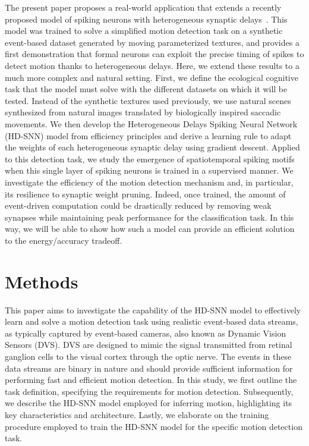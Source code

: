 \documentclass[default]{sn-jnl}%
\theoremstyle{thmstyleone}%
\theoremstyle{thmstyletwo}%
\theoremstyle{thmstylethree}%
\begin{document}
The present paper proposes a real-world application that extends a recently proposed model of spiking neurons with heterogeneous synaptic delays~\cite{grimaldi_learning_2022}. This model was trained to solve a simplified motion detection task on a synthetic event-based dataset generated by moving parameterized textures, and provides a first demonstration that formal neurons can exploit the precise timing of spikes to detect motion thanks to heterogeneous delays. Here, we extend these results to a much more complex and natural setting. First, we define the ecological cognitive task that the model must solve with the different datasets on which it will be tested. Instead of the synthetic textures used previously, we use natural scenes synthesized from natural images translated by biologically inspired saccadic movements. We then develop the Heterogeneous Delays Spiking Neural Network (HD-SNN) model from efficiency principles and derive a learning rule to adapt the weights of each heterogeneous synaptic delay using gradient descent. Applied to this detection task, we study the emergence of spatiotemporal spiking motifs when this single layer of spiking neurons is trained in a supervised manner. We investigate the efficiency of the motion detection mechanism and, in particular, its resilience to synaptic weight pruning. Indeed, once trained, the amount of event-driven computation could be drastically reduced by removing weak synapses while maintaining peak performance for the classification task. In this way, we will be able to show how such a model can provide an efficient solution to the energy/accuracy tradeoff.
%
\section{Methods}
\label{sec:methods}
This paper aims to investigate the capability of the HD-SNN model to effectively learn and solve a motion detection task using realistic event-based data streams, as typically captured by event-based cameras, also known as Dynamic Vision Sensors (DVS). DVS are designed to mimic the signal transmitted from retinal ganglion cells to the visual cortex through the optic nerve. The events in these data streams are binary in nature and should provide sufficient information for performing fast and efficient motion detection. In this study, we first outline the task definition, specifying the requirements for motion detection. Subsequently, we describe the HD-SNN model employed for inferring motion, highlighting its key characteristics and architecture. Lastly, we elaborate on the training procedure employed to train the HD-SNN model for the specific motion detection task.
%
\end{document}
